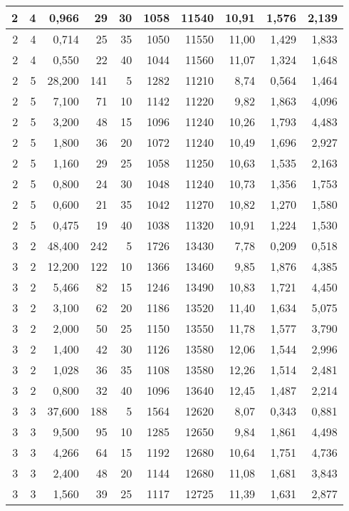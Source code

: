 \begin{tabular}{rrrrrrrrrr}
2 & 4 & 0,966 & 29 & 30 & 1058 & 11540 & 10,91 & 1,576 & 2,139 \\ \hline
2 & 4 & 0,714 & 25 & 35 & 1050 & 11550 & 11,00 & 1,429 & 1,833 \\ \hline
2 & 4 & 0,550 & 22 & 40 & 1044 & 11560 & 11,07 & 1,324 & 1,648 \\ \hline
2 & 5 & 28,200 & 141 & 5 & 1282 & 11210 & 8,74 & 0,564 & 1,464 \\ \hline
2 & 5 & 7,100 & 71 & 10 & 1142 & 11220 & 9,82 & 1,863 & 4,096 \\ \hline
2 & 5 & 3,200 & 48 & 15 & 1096 & 11240 & 10,26 & 1,793 & 4,483 \\ \hline
2 & 5 & 1,800 & 36 & 20 & 1072 & 11240 & 10,49 & 1,696 & 2,927 \\ \hline
2 & 5 & 1,160 & 29 & 25 & 1058 & 11250 & 10,63 & 1,535 & 2,163 \\ \hline
2 & 5 & 0,800 & 24 & 30 & 1048 & 11240 & 10,73 & 1,356 & 1,753 \\ \hline
2 & 5 & 0,600 & 21 & 35 & 1042 & 11270 & 10,82 & 1,270 & 1,580 \\ \hline
2 & 5 & 0,475 & 19 & 40 & 1038 & 11320 & 10,91 & 1,224 & 1,530 \\ \hline
3 & 2 & 48,400 & 242 & 5 & 1726 & 13430 & 7,78 & 0,209 & 0,518 \\ \hline
3 & 2 & 12,200 & 122 & 10 & 1366 & 13460 & 9,85 & 1,876 & 4,385 \\ \hline
3 & 2 & 5,466 & 82 & 15 & 1246 & 13490 & 10,83 & 1,721 & 4,450 \\ \hline
3 & 2 & 3,100 & 62 & 20 & 1186 & 13520 & 11,40 & 1,634 & 5,075 \\ \hline
3 & 2 & 2,000 & 50 & 25 & 1150 & 13550 & 11,78 & 1,577 & 3,790 \\ \hline
3 & 2 & 1,400 & 42 & 30 & 1126 & 13580 & 12,06 & 1,544 & 2,996 \\ \hline
3 & 2 & 1,028 & 36 & 35 & 1108 & 13580 & 12,26 & 1,514 & 2,481 \\ \hline
3 & 2 & 0,800 & 32 & 40 & 1096 & 13640 & 12,45 & 1,487 & 2,214 \\ \hline
3 & 3 & 37,600 & 188 & 5 & 1564 & 12620 & 8,07 & 0,343 & 0,881 \\ \hline
3 & 3 & 9,500 & 95 & 10 & 1285 & 12650 & 9,84 & 1,861 & 4,498 \\ \hline
3 & 3 & 4,266 & 64 & 15 & 1192 & 12680 & 10,64 & 1,751 & 4,736 \\ \hline
3 & 3 & 2,400 & 48 & 20 & 1144 & 12680 & 11,08 & 1,681 & 3,843 \\ \hline
3 & 3 & 1,560 & 39 & 25 & 1117 & 12725 & 11,39 & 1,631 & 2,877 \\ \hline

\end{tabular}

